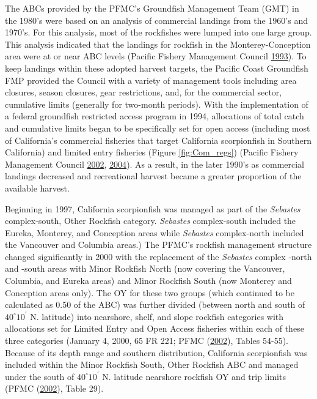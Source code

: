 \documentclass[12pt,]{article}
\begin{document}
The ABCs provided by the PFMC's Groundfish Management Team (GMT) in the
1980's were based on an analysis of commercial landings from the 1960's
and 1970's. For this analysis, most of the rockfishes were lumped into
one large group. This analysis indicated that the landings for rockfish
in the Monterey-Conception area were at or near ABC levels (Pacific
Fishery Management Council \protect\hyperlink{ref-PFMC1993}{1993}). To
keep landings within these adopted harvest targets, the Pacific Coast
Groundfish FMP provided the Council with a variety of management tools
including area closures, season closures, gear restrictions, and, for
the commercial sector, cumulative limits (generally for two-month
periods). With the implementation of a federal groundfish restricted
access program in 1994, allocations of total catch and cumulative limits
began to be specifically set for open access (including most of
California's commercial fisheries that target California scorpionfish in
Southern California) and limited entry fisheries (Figure
\ref{fig:Com_regs}) (Pacific Fishery Management Council
\protect\hyperlink{ref-PFMC2002}{2002},
\protect\hyperlink{ref-PFMC2004}{2004}). As a result, in the later
1990's as commercial landings decreased and recreational harvest became
a greater proportion of the available harvest.

Beginning in 1997, California scorpionfish was managed as part of the
\emph{Sebastes} complex-south, Other Rockfish category. \emph{Sebastes}
complex-south included the Eureka, Monterey, and Conception areas while
\emph{Sebastes} complex-north included the Vancouver and Columbia
areas.) The PFMC's rockfish management structure changed significantly
in 2000 with the replacement of the \emph{Sebastes} complex -north and
-south areas with Minor Rockfish North (now covering the Vancouver,
Columbia, and Eureka areas) and Minor Rockfish South (now Monterey and
Conception areas only). The OY for these two groups (which continued to
be calculated as 0.50 of the ABC) was further divided (between north and
south of \(40^\circ 10^\prime\) N. latitude) into nearshore, shelf, and
slope rockfish categories with allocations set for Limited Entry and
Open Access fisheries within each of these three categories (January 4,
2000, 65 FR 221; PFMC (\protect\hyperlink{ref-PFMC2002}{2002}), Tables
54-55). Because of its depth range and southern distribution, California
scorpionfish was included within the Minor Rockfish South, Other
Rockfish ABC and managed under the south of \(40^\circ 10^\prime\) N.
latitude nearshore rockfish OY and trip limits (PFMC
(\protect\hyperlink{ref-PFMC2002}{2002}), Table 29).
\end{document}
